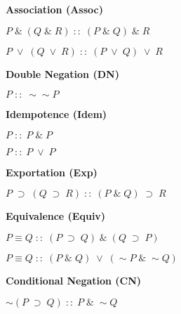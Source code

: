 \documentclass[9pt]{article}
\renewcommand{\not}{\sim}
\renewcommand{\implies}{\; \supset \;}
\newcommand{\aand}{\; \& \;}
\newcommand{\vor}{\; \vee \;}
\newcommand{\sameas}{\; :: \;}
\newcommand{\vsep}{\vspace{.5cm}}
\begin{document}
\begin{centering}
\begin{multicols}{2}
    \vsep

    \textbf{Association (Assoc)} \par
    $P \aand (Q \aand R) \sameas (P \aand Q) \aand R$ \par
    $P \vor (Q \vor R) \sameas (P \vor Q) \vor R$

    \vsep

    \textbf{Double Negation (DN)} \par
    $P \sameas \not \not P$

    \vsep

    \textbf{Idempotence (Idem)} \par
    $P \sameas P \aand P$ \par
    $P \sameas P \vor P$

    \vsep

    \textbf{Exportation (Exp)} \par
    $P \implies (Q \implies R) \sameas (P \aand Q) \implies
    R$

    \vsep

    \textbf{Equivalence (Equiv)} \par
    $P \equiv Q \sameas (P \implies Q) \aand (Q \implies
    P)$ \par
    $P \equiv Q \sameas (P \aand Q) \vor (\not P \aand \not
    Q)$
  \end{multicols}

  \textbf{Conditional Negation (CN)} \par
  $\not (P \implies Q) \sameas P \aand \not Q$

\end{centering}
\end{document}
